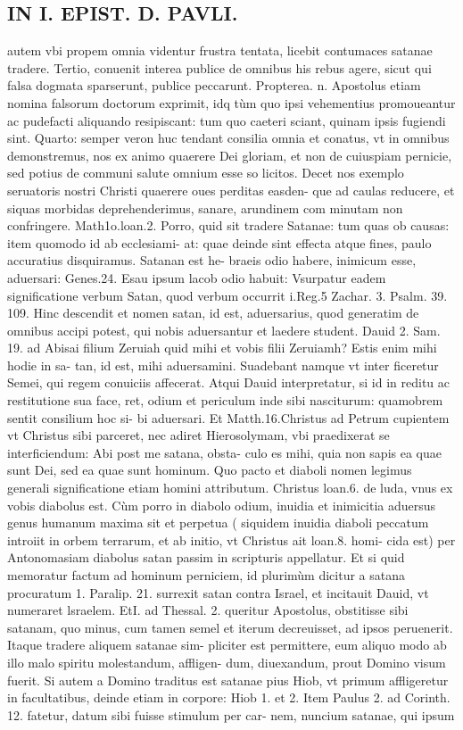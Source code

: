 \documentclass{article}
\begin{document}
\begin{pages}
\section*{IN I. EPIST. D. PAVLI. }
\marginpar{[ p.62 ]}\pstart autem vbi propem omnia videntur frustra tentata, licebit contumaces satanae tradere. Tertio, conuenit interea publice de omnibus his rebus agere, sicut qui falsa dogmata sparserunt, publice peccarunt. Propterea. n. Apostolus etiam nomina falsorum doctorum exprimit, idq tùm quo ipsi vehementius promoueantur ac pudefacti aliquando resipiscant: tum quo caeteri sciant, quinam ipsis fugiendi sint. Quarto: semper veron huc tendant consilia omnia et conatus, vt in omnibus demonstremus, nos ex animo quaerere Dei gloriam, et non de cuiuspiam pernicie, sed potius de communi salute omnium esse so licitos. Decet nos exemplo seruatoris nostri Christi quaerere oues perditas easden- que ad caulas reducere, et siquas morbidas deprehenderimus, sanare, arundinem com minutam non confringere. Math1o.loan.2.  \pend\pstart Porro, quid sit tradere Satanae: tum quas ob causas: item quomodo id ab ecclesiami- at: quae deinde sint effecta atque  fines, paulo accuratius disquiramus. Satanan est he- braeis odio habere, inimicum esse, aduersari: Genes.24. Esau ipsum lacob odio habuit: Vsurpatur eadem significatione verbum Satan, quod verbum occurrit i.Reg.5 Zachar. 3. Psalm. 39. 109. Hinc descendit et nomen satan, id est, aduersarius, quod generatim de omnibus accipi potest, qui nobis aduersantur et laedere student. Dauid 2. Sam. 19. ad Abisai filium Zeruiah quid mihi et vobis filii Zeruiamh? Estis enim mihi hodie in sa- tan, id est, mihi aduersamini. Suadebant namque  vt inter ficeretur Semei, qui regem conuiciis affecerat. Atqui Dauid interpretatur, si id in reditu ac restitutione sua face, ret, odium et periculum inde sibi nasciturum: quamobrem sentit consilium hoc si- bi aduersari. Et Matth.16.Christus ad Petrum cupientem vt Christus sibi parceret, nec adiret Hierosolymam, vbi praedixerat se interficiendum: Abi post me satana, obsta- culo es mihi, quia non sapis ea quae sunt Dei, sed ea quae sunt hominum. Quo pacto et diaboli nomen legimus generali significatione etiam homini attributum. Christus loan.6. de luda, vnus ex vobis diabolus est. Cùm porro in diabolo odium, inuidia et inimicitia aduersus genus humanum maxima sit et perpetua ( siquidem inuidia diaboli peccatum introiit in orbem terrarum, et ab initio, vt Christus ait loan.8. homi- cida est) per Antonomasiam diabolus satan passim in scripturis appellatur. Et si quid memoratur factum ad hominum perniciem, id plurimùm dicitur a satana procuratum 1. Paralip. 21. surrexit satan contra Israel, et incitauit Dauid, vt numeraret lsraelem. EtI. ad Thessal. 2. queritur Apostolus, obstitisse sibi satanam, quo minus, cum tamen semel et iterum decreuisset, ad ipsos peruenerit. Itaque  tradere aliquem satanae sim- pliciter est permittere, eum aliquo modo ab illo malo spiritu molestandum, affligen- dum, diuexandum, prout Domino visum fuerit. Si autem a Domino traditus est satanae pius Hiob, vt primum affligeretur in facultatibus, deinde etiam in corpore: Hiob 1. et 2. Item Paulus 2. ad Corinth. 12. fatetur, datum sibi fuisse stimulum per car- nem, nuncium satanae, qui ipsum 
\end{pages}
\end{document}
